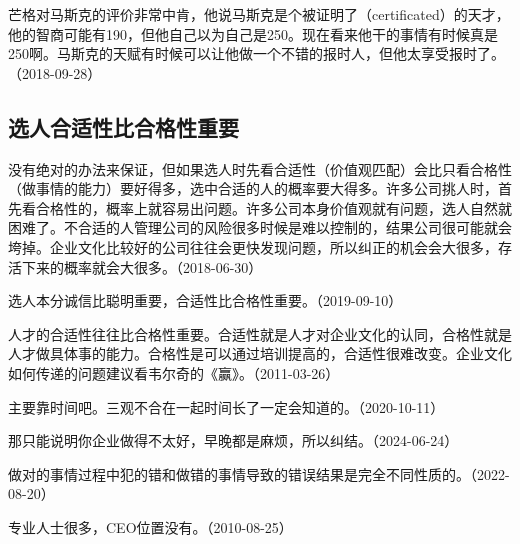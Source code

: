
芒格对马斯克的评价非常中肯，他说马斯克是个被证明了（certificated）的天才，他的智商可能有190，但他自己以为自己是250。现在看来他干的事情有时候真是250啊。马斯克的天赋有时候可以让他做一个不错的报时人，但他太享受报时了。（2018-09-28）

\subsection{选人合适性比合格性重要}


没有绝对的办法来保证，但如果选人时先看合适性（价值观匹配）会比只看合格性（做事情的能力）要好得多，选中合适的人的概率要大得多。许多公司挑人时，首先看合格性的，概率上就容易出问题。许多公司本身价值观就有问题，选人自然就困难了。不合适的人管理公司的风险很多时候是难以控制的，结果公司很可能就会垮掉。企业文化比较好的公司往往会更快发现问题，所以纠正的机会会大很多，存活下来的概率就会大很多。（2018-06-30）

选人本分诚信比聪明重要，合适性比合格性重要。（2019-09-10）

人才的合适性往往比合格性重要。合适性就是人才对企业文化的认同，合格性就是人才做具体事的能力。合格性是可以通过培训提高的，合适性很难改变。企业文化如何传递的问题建议看韦尔奇的《赢》。（2011-03-26）


主要靠时间吧。三观不合在一起时间长了一定会知道的。（2020-10-11）


那只能说明你企业做得不太好，早晚都是麻烦，所以纠结。（2024-06-24）


做对的事情过程中犯的错和做错的事情导致的错误结果是完全不同性质的。（2022-08-20）


专业人士很多，CEO位置没有。（2010-08-25）


